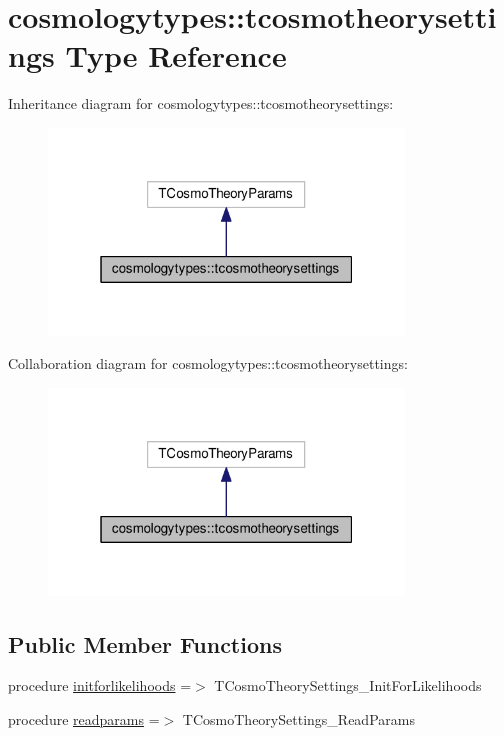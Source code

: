 \hypertarget{structcosmologytypes_1_1tcosmotheorysettings}{}\section{cosmologytypes\+:\+:tcosmotheorysettings Type Reference}
\label{structcosmologytypes_1_1tcosmotheorysettings}


Inheritance diagram for cosmologytypes\+:\+:tcosmotheorysettings\+:
\nopagebreak
\begin{figure}[H]
\begin{center}
\leavevmode
\includegraphics[width=268pt]{structcosmologytypes_1_1tcosmotheorysettings__inherit__graph}
\end{center}
\end{figure}


Collaboration diagram for cosmologytypes\+:\+:tcosmotheorysettings\+:
\nopagebreak
\begin{figure}[H]
\begin{center}
\leavevmode
\includegraphics[width=268pt]{structcosmologytypes_1_1tcosmotheorysettings__coll__graph}
\end{center}
\end{figure}
\subsection*{Public Member Functions}
\begin{DoxyCompactItemize}
\item 
procedure \mbox{\hyperlink{structcosmologytypes_1_1tcosmotheorysettings_af515fcc7628babb86fc20d5be711de16}{initforlikelihoods}} =$>$ T\+Cosmo\+Theory\+Settings\+\_\+\+Init\+For\+Likelihoods
\item 
procedure \mbox{\hyperlink{structcosmologytypes_1_1tcosmotheorysettings_aad23dcf8aeb116b3a46034398128e75c}{readparams}} =$>$ T\+Cosmo\+Theory\+Settings\+\_\+\+Read\+Params
\end{DoxyCompactItemize}
